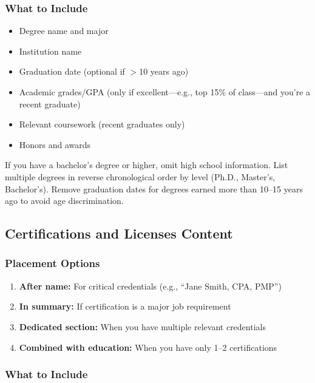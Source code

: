 \documentclass[11pt,a4paper]{article}
\begin{document}
\subsubsection{What to Include}

\begin{itemize}
    \item Degree name and major
    \item Institution name
    \item Graduation date (optional if $>$10 years ago)
    \item Academic grades/GPA (only if excellent---e.g., top 15\% of class---and you're a recent graduate)
    \item Relevant coursework (recent graduates only)
    \item Honors and awards
\end{itemize}

\begin{bestpractice}
If you have a bachelor's degree or higher, omit high school information. List multiple degrees in reverse chronological order by level (Ph.D., Master's, Bachelor's). Remove graduation dates for degrees earned more than 10--15 years ago to avoid age discrimination.
\end{bestpractice}

\subsection{Certifications and Licenses Content}

\subsubsection{Placement Options}

\begin{enumerate}
    \item \textbf{After name:} For critical credentials (e.g., ``Jane Smith, CPA, PMP'')
    \item \textbf{In summary:} If certification is a major job requirement
    \item \textbf{Dedicated section:} When you have multiple relevant credentials
    \item \textbf{Combined with education:} When you have only 1--2 certifications
\end{enumerate}

\subsubsection{What to Include}
\end{document}
